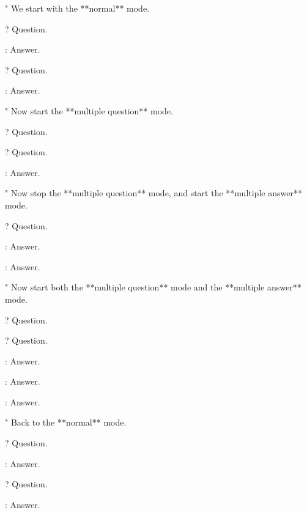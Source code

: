 "
  We start with the **normal** mode.

?
  Question.

:
  Answer.

?
  Question.

:
  Answer.

"
  Now start the **multiple question** mode.

\EnableMultipleQuestion

?
  Question.

?
  Question.

:
  Answer.

"
  Now stop the **multiple question** mode, and start the **multiple answer** mode.

\DisableMultipleQuestion

\EnableMultipleAnswer

?
  Question.

:
  Answer.

:
  Answer.

"
  Now start both the **multiple question** mode and the **multiple answer** mode.

\EnableMultipleQuestion

\EnableMultipleAnswer

?
  Question.

?
  Question.

:
  Answer.

:
  Answer.

:
  Answer.

"
  Back to the **normal** mode.

\DisableMultipleQuestion

\DisableMultipleAnswer

?
  Question.

:
  Answer.

?
  Question.

:
  Answer.
